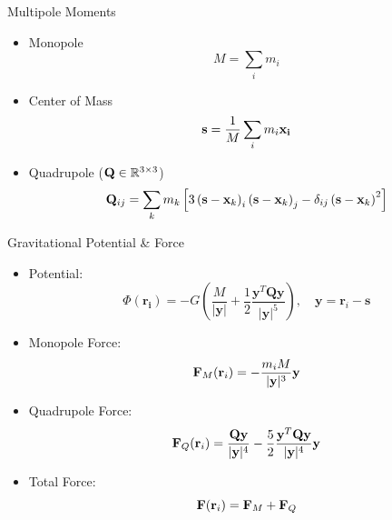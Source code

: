 \begin{frame}{Multipole Moments}
	\begin{itemize}
		\item Monopole
		      \begin{equation}
			      M = \sum_i m_i
		      \end{equation}
		\item Center of Mass
		      \begin{equation}
			      \vb{s} = \frac{1}{M}\sum_im_i\vb{x_i}
		      \end{equation}
		\item Quadrupole ($\vb{Q} \in \mathbb{R}^{3\times3}$)
		      \begin{equation}
			      \vb{Q}_{i j}=\sum_k m_k\left[3\left(\mathbf{s}-\mathbf{x}_k\right)_i\left(\mathbf{s}-\mathbf{x}_k\right)_j-\delta_{i j}\left(\mathbf{s}-\mathbf{x}_k\right)^2\right]
		      \end{equation}
	\end{itemize}
\end{frame}

\begin{frame}{Gravitational Potential \& Force}
	\begin{itemize}
		\item Potential:
		      \begin{equation}
			      \Phi(\mathbf{r_i})=-G\left(\frac{M}{|\mathbf{y}|}+\frac{1}{2} \frac{\mathbf{y}^T \mathbf{Q} \mathbf{y}}{|\mathbf{y}|^5}\right), \quad \mathbf{y}=\mathbf{r}_i-\mathbf{s}
		      \end{equation}
		\item Monopole Force:
		      \begin{equation}
			      \vb{F}_M(\vb{r}_i) = - \frac{m_i  M}{ | \vb{y} | ^3}\vb{y}
		      \end{equation}
		\item Quadrupole Force:
		      \begin{equation}
			      \vb{F}_Q(\vb{r}_i) = \frac{\vb{Q}\vb{y}}{ | \vb{y} | ^4} - \frac{5}{2} \frac{\vb{y}^T \vb{Q} \vb{y}} { | \vb{y} | ^4} \vb{y}
		      \end{equation}
		\item Total Force:
		      \begin{equation}
			      \vb{F}(\vb{r}_i) = \vb{F}_M + \vb{F}_Q
		      \end{equation}
	\end{itemize}
\end{frame}



